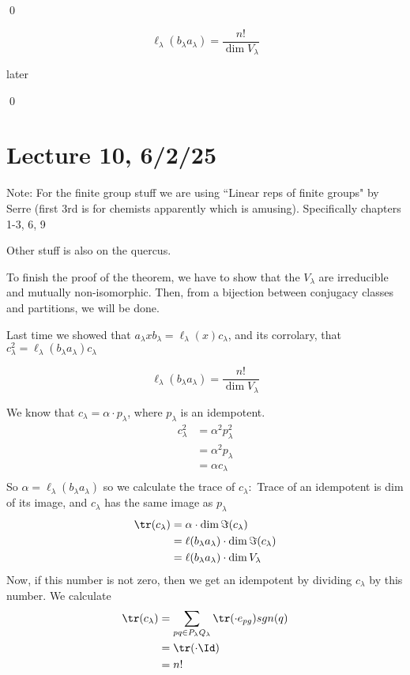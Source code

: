 \documentclass[x11names,reqno,14pt]{extarticle}
\begin{document}
\qed

\cor

\[
\ell_\lambda(b_\lambda a_\lambda) = \frac{n!}{\dim V_\lambda}
\]

\proof

later

\qed

\section*{Lecture 10, 6/2/25}

Note: For the finite group stuff we are using ``Linear reps of finite groups" by Serre (first 3rd is for chemists apparently which is amusing). Specifically chapters 1-3, 6, 9

Other stuff is also on the quercus. 

To finish the proof of the theorem, we have to show that the $V_\lambda$ are irreducible and mutually non-isomorphic. Then, from a bijection between conjugacy classes and partitions, we will be done. 

Last time we showed that $a_\lambda x b_\lambda = \ell_\lambda(x)c_\lambda$, and its corrolary, that $c_\lambda^2 = \ell_\lambda(b_\lambda a_\lambda)c_\lambda$

\cor

\[
\ell_\lambda(b_\lambda a_\lambda) = \frac{n!}{\dim V_\lambda}
\]

\proof

We know that $c_\lambda = \alpha \cdot p_\lambda$, where $p_\lambda$ is an idempotent. 
\begin{align*}
c_\lambda^2 & = \alpha^2p_\lambda^2 \\
& = \alpha^2 p_\lambda \\&= \alpha c_\lambda \\
\end{align*}
So $\alpha = \ell_\lambda(b_\lambda a_\lambda)$ so we calculate the trace of $c_\lambda:$
Trace of an idempotent is dim of its image, and $c_\lambda$ has the same image as $p_\lambda$
\begin{align*}
\tr(c_\lambda) & = \alpha\cdot\dim\Im(c_\lambda) \\
& = \ell(b_\lambda a_\lambda)\cdot\dim\Im(c_\lambda) \\
& = \ell(b_\lambda a_\lambda)\cdot \dim V_\lambda 
\end{align*}
Now, if this number is not zero, then we get an idempotent by dividing $c_\lambda$ by this number. We calculate
\begin{align*}
\tr(c_\lambda) & = \sum_{pq \in P_\lambda Q_\lambda} \tr(\cdot e_{pg})sgn(q) \\
& = \tr(\cdot\Id) \\
& = n!
\end{align*}
\end{document}
